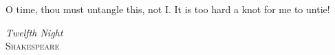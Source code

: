 \documentclass[11pt, a4paper, twoside]{book}
\begin{document}



  

  


\cleardoublepage
\thispagestyle{empty}
\epigraph{O time, thou must untangle this, not I.
It is too hard a knot for me to untie!}
{\textit{Twelfth Night}\\
\textsc{Shakespeare}}




\tableofcontents
\listoffigures
\listoftables











%



\appendix %




\backmatter %


{}
%



\end{document}
